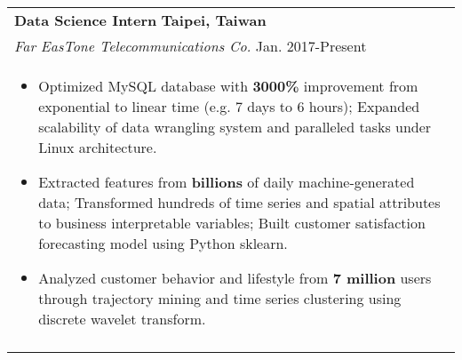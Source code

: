 \documentclass[a4paper,11pt]{article} %
\begin{document}
{\begin{tabular}{p{18.5cm}}
{\large\bf{Data Science Intern}} \hfill \bf{Taipei, Taiwan}\\
{\it Far EasTone Telecommunications Co.} \hfill  Jan. 2017-Present\\%
\begin{itemize}
\vspace{-3mm}
\item Optimized MySQL database with {\bf3000\%} improvement from exponential to linear time (e.g. 7 days to 6 hours); Expanded scalability of data wrangling system and paralleled tasks under Linux architecture.
\item Extracted features from {\bf billions} of daily machine-generated data; Transformed hundreds of time series and spatial attributes to business interpretable variables; Built customer satisfaction forecasting model using Python sklearn. 
\item Analyzed customer behavior and lifestyle from {\bf7 million} users through trajectory mining and time series clustering using discrete wavelet transform.\vspace*{-\baselineskip}
\end{itemize} \\ 
\vspace{0.5mm}


\end{tabular}}
\end{document}
